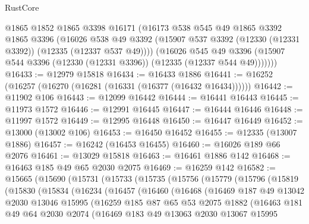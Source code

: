 \begin{lexlean}{RustCore}
\begin{coremodule}
        @1865
        @1852
        @1865
        @3398
        @16171
        (@16173
          @538
          @545
          @49
          @1865
          @3392
          @1865
          @3396
          (@16026
            @538
            @49
            @3392
            (@15907 @537 @3392 (@12330 (@12331 @3392)) (@12335 (@12337 @537 @49))))
          (@16026
            @545
            @49
            @3396
            (@15907 @544 @3396 (@12330 (@12331 @3396)) (@12335 (@12337 @544 @49)))))))
@16433 := @12979 @15818
@16434 := @16433 @1886
@16441 := @16252 (@16257 (@16270 (@16281 (@16331 (@16377 (@16432 @16434))))))
@16442 := @11902 @106
@16443 := @12099 @16442
@16444 := @16441 @16443
@16445 := @11973 @1572
@16446 := @12991 @16445
@16447 := @16444 @16446
@16448 := @11997 @1572
@16449 := @12995 @16448
@16450 := @16447 @16449
@16452 := @13000 (@13002 @106)
@16453 := @16450 @16452
@16455 := @12335 (@13007 @1886)
@16457 := @16242 (@16453 @16455)
@16460 := @16026 @189 @66 @2076
@16461 := @13029 @15818
@16463 := @16461 @1886 @142
@16468 := @16463 @185 @49 @65 @2030 @2075
@16469 := @16259 @142
@16582 := @15665
    (@15690
      (@15731
        (@15733
          (@15735
            (@15756
              (@15779
                (@15796
                  (@15819
                    (@15830
                      (@15834
                        (@16234
                          (@16457
                            (@16460
                              (@16468
                                (@16469
                                  @187
                                  @49
                                  @13042
                                  @2030
                                  @13046
                                  @15995
                                  (@16259
                                    @185
                                    @87
                                    @65
                                    @53
                                    @2075
                                    @1882
                                    (@16463
                                      @181
                                      @49
                                      @64
                                      @2030
                                      @2074
                                      (@16469
                                        @183
                                        @49
                                        @13063
                                        @2030
                                        @13067
                                        @15995

\end{coremodule}
\end{lexlean}

